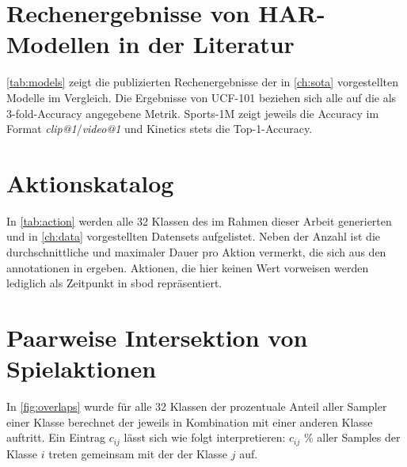 \chapter{Rechenergebnisse von HAR-Modellen in der Literatur}
\label{ch:leaderboard}

\autoref{tab:models} zeigt die publizierten Rechenergebnisse der in \autoref{ch:sota} vorgestellten Modelle im Vergleich.
Die Ergebnisse von UCF-101 beziehen sich alle auf die als 3-fold-Accuracy angegebene Metrik.
Sports-1M zeigt jeweils die Accuracy im Format \emph{clip@1}/\emph{video@1} und Kinetics stets die Top-1-Accuracy.

\begin{figure}
    \label{tab:models}
\end{figure}

\chapter{Aktionskatalog}
\label{ch:aktionskatalog}

In \autoref{tab:action} werden alle 32 Klassen des im Rahmen dieser Arbeit generierten und in \autoref{ch:data} vorgestellten Datensets aufgelistet.
Neben der Anzahl ist die durchschnittliche und maximaler Dauer pro Aktion vermerkt, die sich aus den \gls{annotationen} in \cite{Statsbomb20} ergeben.
Aktionen, die hier keinen Wert vorweisen werden lediglich als Zeitpunkt in \gls{sbod} repräsentiert.

\begin{figure}
    \centering
    \begin{subfigure}{0.45\textwidth}
        \centering
    \end{subfigure}
    \begin{subfigure}{0.45\textwidth}
        \centering
    \end{subfigure}
    \label{tab:action}
\end{figure}

\chapter{Paarweise Intersektion von Spielaktionen}
\label{ch:overlaps}

In \autoref{fig:overlaps} wurde für alle 32 Klassen der prozentuale Anteil aller Sampler einer Klasse berechnet der jeweils in Kombination mit einer anderen Klasse auftritt.
Ein Eintrag $c_{ij}$ lässt sich wie folgt interpretieren:
$c_{ij}$ \% aller Samples der Klasse $i$ treten gemeinsam mit der der Klasse $j$ auf.

